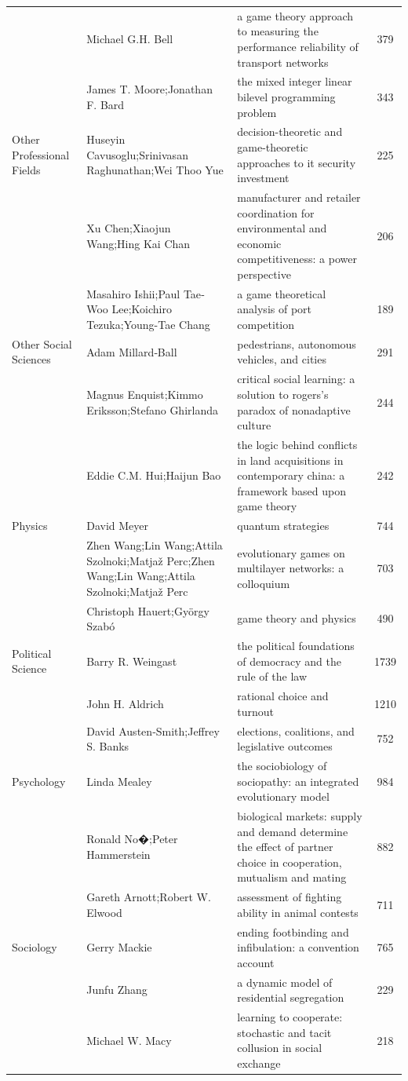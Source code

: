 \documentclass[
  12pt,
]{article}
\begin{document}
\begin{longtable}[t]{|>{\raggedright\arraybackslash}p{4cm}>{\raggedright\arraybackslash}p{4cm}>{\raggedright\arraybackslash}p{4cm}>{}c|}
 & Michael G.H. Bell & a game theory approach to measuring the performance reliability of transport networks & 379\\
 & James T. Moore;Jonathan F. Bard & the mixed integer linear bilevel programming problem & 343\\
Other Professional Fields & Huseyin Cavusoglu;Srinivasan Raghunathan;Wei Thoo Yue & decision-theoretic and game-theoretic approaches to it security investment & 225\\
 & Xu Chen;Xiaojun Wang;Hing Kai Chan & manufacturer and retailer coordination for environmental and economic competitiveness: a power perspective & 206\\
 & Masahiro Ishii;Paul Tae‐Woo Lee;Koichiro Tezuka;Young-Tae Chang & a game theoretical analysis of port competition & 189\\
Other Social Sciences & Adam Millard‐Ball & pedestrians, autonomous vehicles, and cities & 291\\
 & Magnus Enquist;Kimmo Eriksson;Stefano Ghirlanda & critical social learning: a solution to rogers's paradox of nonadaptive culture & 244\\
 & Eddie C.M. Hui;Haijun Bao & the logic behind conflicts in land acquisitions in contemporary china: a framework based upon game theory & 242\\
Physics & David Meyer & quantum strategies & 744\\
 & Zhen Wang;Lin Wang;Attila Szolnoki;Matjaž Perc;Zhen Wang;Lin Wang;Attila Szolnoki;Matjaž Perc & evolutionary games on multilayer networks: a colloquium & 703\\
 & Christoph Hauert;György Szabó & game theory and physics & 490\\
Political Science & Barry R. Weingast & the political foundations of democracy and the rule of the law & 1739\\
 & John H. Aldrich & rational choice and turnout & 1210\\
 & David Austen‐Smith;Jeffrey S. Banks & elections, coalitions, and legislative outcomes & 752\\
Psychology & Linda Mealey & the sociobiology of sociopathy: an integrated evolutionary model & 984\\
 & Ronald No�;Peter Hammerstein & biological markets: supply and demand determine the effect of partner choice in cooperation, mutualism and mating & 882\\
 & Gareth Arnott;Robert W. Elwood & assessment of fighting ability in animal contests & 711\\
Sociology & Gerry Mackie & ending footbinding and infibulation: a convention account & 765\\
 & Junfu Zhang & a dynamic model of residential segregation & 229\\
 & Michael W. Macy & learning to cooperate: stochastic and tacit collusion in social exchange & 218\\
\bottomrule
\end{longtable}
\endgroup{}
\end{document}
